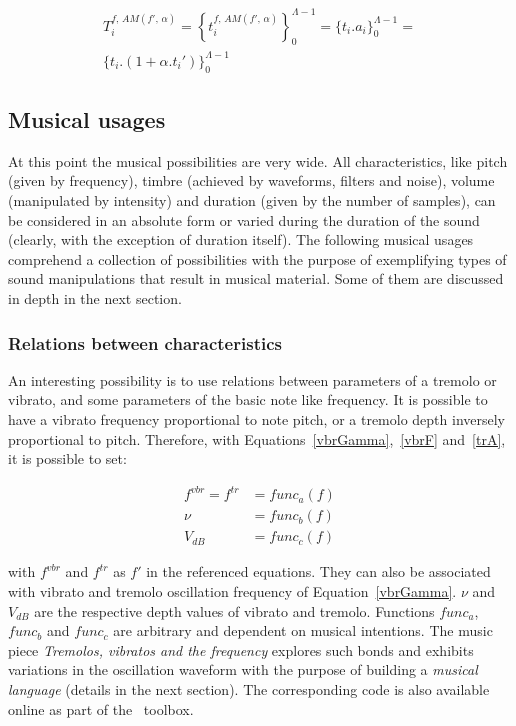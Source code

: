 \begin{multline}\label{amT}
T_i^{f,\,AM(f',\,\alpha)}=\left\{ t_i^{f,\,AM(f',\,\alpha)} \right\}_0^{\Lambda-1}=\{ t_i . a_i \}_0^{\Lambda-1}= \\ \{t_i . (1 + \alpha . t_i')    \}_0^{\Lambda-1}
\end{multline}

\subsection{Musical usages}\label{subsec:mus2}
At this point the musical possibilities are very wide. All characteristics, like pitch (given by frequency), timbre (achieved by waveforms, filters and noise), volume (manipulated by intensity) and duration (given by the number of samples), can be considered in an absolute form or varied during the duration of the sound (clearly, with the exception of duration itself). The following musical usages comprehend a collection of possibilities with the purpose of exemplifying types of sound manipulations that result in musical material. Some of them are discussed in depth in the next section.

\subsubsection{Relations between characteristics}
An interesting possibility is to use relations between parameters of
a tremolo or vibrato, and some parameters of the basic note like frequency. It is possible to have a vibrato frequency proportional
to note pitch, or a tremolo depth inversely proportional to
pitch. Therefore, with Equations~\ref{vbrGamma},~\ref{vbrF} and~\ref{trA}, it is possible to set:

\begin{equation}\label{eq:vinculos}
\begin{split}
f^{vbr} = f^{tr} & = func_a(f) \\
\nu & = func_b(f) \\
V_{dB} & = func_c(f)
\end{split}
\end{equation}

\noindent with $f^{vbr}$ and $f^{tr}$ as $f'$ in the referenced equations. They can also be associated with vibrato and tremolo oscillation frequency of Equation~\ref{vbrGamma}. 
 $\nu$ and $V_{dB}$ are the respective depth values of vibrato and
tremolo. Functions $func_a$, $func_b$ and $func_c$ are arbitrary and dependent on musical intentions. The music piece \emph{Tremolos, vibratos and the
frequency} explores such bonds and exhibits variations in the oscillation waveform with the purpose of building a \emph{musical
language} (details in the next section). The corresponding code is also available online as part of the \massa\ toolbox.


